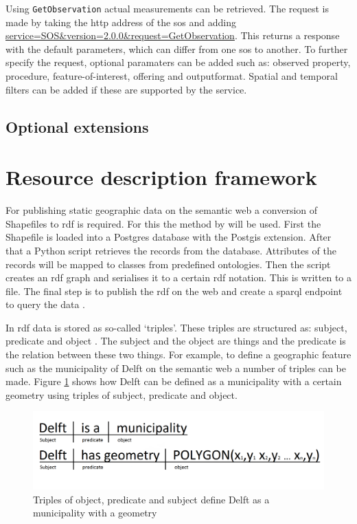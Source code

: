 Using \texttt{GetObservation} actual measurements can be retrieved. The request is made by taking the \ac{http} address of the \ac{sos} and adding \url{service=SOS\&version=2.0.0\&request=GetObservation}. This returns a response with the default parameters, which can differ from one \ac{sos} to another. To further specify the request, optional paramaters can be added such as: observed property, procedure, feature-of-interest, offering and outputformat. Spatial and temporal filters can be added if these are supported by the service. 

\subsection{Optional extensions}


\section{Resource description framework}
For publishing static geographic data on the semantic web a conversion of Shapefiles to \ac{rdf} is required. For this the method by \cite{LD:Missier} will be used. First the Shapefile is loaded into a Postgres database with the Postgis extension. After that a Python script retrieves the records from the database. Attributes of the records will be mapped to classes from predefined ontologies. Then the script creates an \ac{rdf} graph and serialises it to a certain \ac{rdf} notation. This is written to a file. The final step is to publish the \ac{rdf} on the web and create a \ac{sparql} endpoint to query the data \citep{LD:Missier}. 

In \ac{rdf} data is stored as so-called `triples'. These triples are structured as: subject, predicate and object \citep{LD:Berners-lee}. The subject and the object are things and the predicate is the relation between these two things. For example, to define a geographic feature such as the municipality of Delft on the semantic web a number of triples can be made. Figure \ref{fig:Triples} shows how Delft can be defined as a municipality with a certain geometry using triples of subject, predicate and object.

\begin{figure}
	\includegraphics[width=0.7\linewidth]{figs/Triples.png}
	\caption{Triples of object, predicate and subject define Delft as a municipality with a geometry}
	\label{fig:Triples}
\end{figure}

